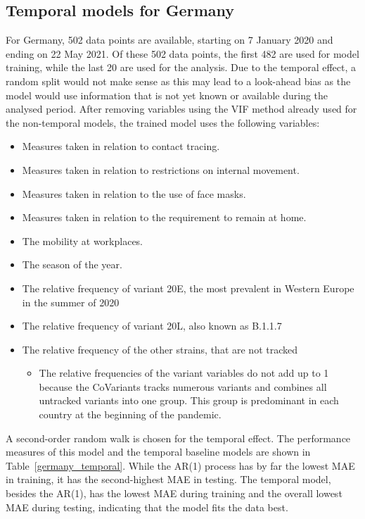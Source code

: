 \subsection{Temporal models for Germany}\label{sec:temp_ger}
For Germany, 502 data points are available, starting on 7 January 2020 and ending on 22 May 2021. Of these 502 data points, the first 482 are used for model training, while the last 20 are used for the analysis. Due to the temporal effect, a random split would not make sense as this may lead to a look-ahead bias as the model would use information that is not yet known or available during the analysed period. After removing variables using the VIF method already used for the non-temporal models, the trained model uses the following variables:
\begin{itemize}
    \item Measures taken in relation to contact tracing.
    \item Measures taken in relation to restrictions on internal movement.
    \item Measures taken in relation to the use of face masks.
    \item Measures taken in relation to the requirement to remain at home.
    \item The mobility at workplaces.
    \item The season of the year.
    \item The relative frequency of variant 20E, the most prevalent in Western Europe in the summer of 2020
    \item The relative frequency of variant 20L, also known as B.1.1.7
    \item The relative frequency of the other strains, that are not tracked
    \begin{itemize}
        \item The relative frequencies of the variant variables do not add up to 1 because the CoVariants tracks numerous variants and combines all untracked variants into one group. This group is predominant in each country at the beginning of the pandemic.
    \end{itemize}
\end{itemize}
A second-order random walk is chosen for the temporal effect. The performance measures of this model and the temporal baseline models are shown in Table~\ref{germany_temporal}. While the AR(1) process has by far the lowest MAE in training, it has the second-highest MAE in testing. The temporal model, besides the AR(1), has the lowest MAE during training and the overall lowest MAE during testing, indicating that the model fits the data best.
